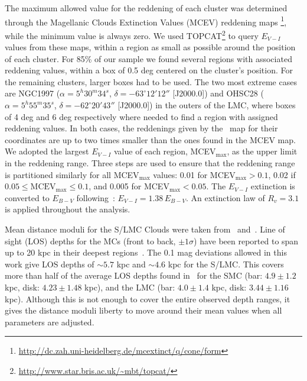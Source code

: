 \documentclass{aa}
\begin{document}
The maximum allowed value for the reddening of each cluster was determined
through the Magellanic Clouds Extinction Values (MCEV) reddening maps
\citep{Haschke_2011}\footnote{\url{
http://dc.zah.uni-heidelberg.de/mcextinct/q/cone/form}}, while
the minimum value is always zero.
%
We used TOPCAT\footnote{\url{http://www.star.bris.ac.uk/~mbt/topcat/}}
to query $E_{V-I}$ values from these maps, within a region as small as possible
around the position of each cluster.
For 85\% of our sample we found several regions with associated reddening
values, within a box of 0.5 deg centered on the cluster's position.
For the remaining clusters, larger boxes had to be used. The two most extreme
cases are NGC1997
($\alpha{=}5^h30^m34^s$, $\delta{=}-63^\circ12'12''$ [J2000.0]) and OHSC28
($\alpha{=}5^h55^m35^s$, $\delta{=}-62^\circ20'43''$ [J2000.0]) in the outers
of the LMC, where boxes of 4 deg and 6 deg respectively where needed to find a
region with assigned reddening values. In both cases, the reddenings given by
the~\cite{Schlafly_2011} map for their coordinates are up to two times smaller
than the ones found in the MCEV map.
%
We adopted the largest $E_{V-I}$ value of each region, MCEV$_{\max}$, as the
upper limit in the reddening range. Three steps are used to ensure that the
reddening range is partitioned similarly for all MCEV$_{\max}$ values: 0.01 for
MCEV$_{\max} {>}0.1$, 0.02 if $0.05{\leq}\mathrm{MCEV}_{\max}{\leq}0.1$, and
0.005 for MCEV$_{\max}{<}0.05$.
%
The $E_{V-I}$ extinction is converted to $E_{B-V}$
following~\cite{Tammann_2003}: $E_{V-I}{=}1.38\,E_{B-V}$. An extinction
law of $R_v{=}3.1$ is applied throughout the analysis.

Mean distance moduli for the S/LMC Clouds were taken
from~\cite{de_Grijs_2015} and~\cite{de_Grijs_2014}.
%
Line of sight (LOS) depths for the MCs (front to back, $\pm1\sigma$) have been
reported to span up to 20 kpc in their deepest
regions~\citep{Subramanian_2009,Nidever_2013,Scowcroft_2015}.
%
The 0.1 mag deviations allowed in this work give LOS depths of ${\sim}5.7$ kpc
and ${\sim}4.6$ kpc for the S/LMC\@. This covers more than half of the average
LOS depths found in~\cite{Subramanian_2009} for the SMC (bar: $4.9\pm1.2$ kpc,
disk: $4.23\pm1.48$ kpc), and the LMC (bar: $4.0\pm1.4$ kpc, disk: $3.44\pm1.16$
kpc).
Although this is not enough to cover the entire observed depth ranges, it gives
the distance moduli liberty to move around their mean values when all parameters
are adjusted.
\end{document}
